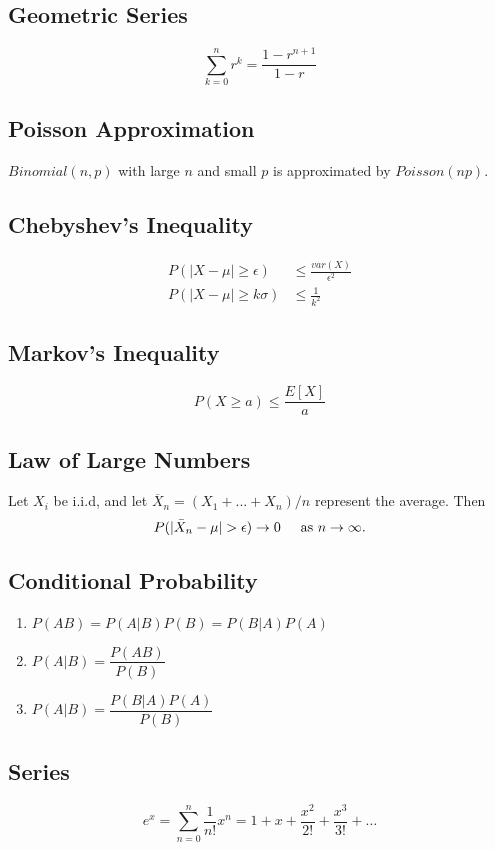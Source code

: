 \documentclass[11pt, twocolumn]{article}
\theoremstyle{definition}
\begin{document}
\subsection*{Geometric Series}
\[\sum_{k=0}^n r^k = \dfrac{   1-r^{n+1}}{1-r}\]

\subsection*{Poisson Approximation}
$Binomial(n,p)$ with large $n$ and small $p$ is approximated by $Poisson(np)$.

\subsection*{Chebyshev's Inequality}
\begin{align*}
P(|X-\mu|\geq \epsilon) &\leq \frac{var(X)}{\epsilon^2}\\
P(|X-\mu| \geq k \sigma) &\leq  \frac{1}{k^2}	
\end{align*}

\subsection*{Markov's Inequality}
\[	P(X \geq a) \leq \frac{E[X]}{a} \]

\subsection*{Law of Large Numbers}
	Let $X_i$ be i.i.d, and let $\overline{X}_n=(X_1+...+X_n)/n$ represent the average. Then
	\[P(| \bar{X}_n - \mu | > \epsilon) \rightarrow 0 \hspace{.5cm} \text {as } n \rightarrow \infty.\]

\subsection*{Conditional Probability}
\begin{enumerate}
\item	$P(AB)=P(A|B)P(B)=P(B|A)P(A)$
\item	$P(A|B)=\dfrac{P(AB)}{P(B)}$
\item	$P(A|B)=\dfrac{  P(B|A)P(A) }{ P(B)}$
\end{enumerate}

\subsection*{Series}
\[e^x=\sum_{n=0}^n\frac{1}{n!}x^n=1+x+\frac{x^2}{2!}+\frac{x^3}{3!}+\hdots \]
\end{document}
